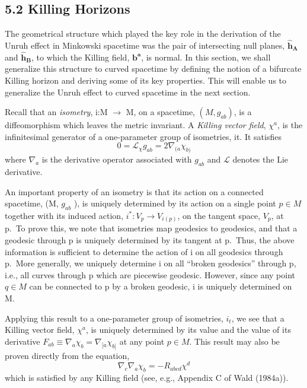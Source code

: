 \documentclass[11pt,a4paper]{article}
\begin{document}
\subsection*{5.2 Killing Horizons}\hypertarget{sec:5.2}{}

The geometrical structure which played the key role in the derivation of the Unruh effect in Minkowski spacetime was the pair of intersecting null planes, \(\mathbf{\hat{h}_A}\) and \(\mathbf{\hat{h}_B}\), to which the Killing field, \(\mathbf{b^a}\), is normal. In this section, we shall generalize this structure to curved spacetime by defining the notion of a bifurcate Killing horizon and deriving some of its key properties. This will enable us to generalize the Unruh effect to curved spacetime in the next section.

Recall that an \emph{isometry}, i:M \(\rightarrow\) M, on a spacetime, \((M,g_{ab})\), is a diffeomorphism which leaves the metric invariant. A \emph{Killing vector field}, \(\chi^a\), is the infinitesimal generator of a one-parameter group of isometries, it. It satisfies
\begin{equation*}
0 = \mathcal L_\chi g_{ab} = 2\nabla_{(a} \chi_{b)} \tag{5.2.1}\label{eq:5.2.1}
\end{equation*} \hypertarget{source-132}{} where \(\nabla_a\) is the derivative operator associated with \(g_{ab}\) and \(\mathcal{L}\) denotes the Lie derivative.

An important property of an isometry is that its action on a connected spacetime, (M, \(g_{ab}\) ), is uniquely determined by its action on a single point \(p\in M\) together with its induced action, \(i^*:V_p \rightarrow V_{i(p)}\), on the tangent space, \(V_p\), at p.~To prove this, we note that isometries map geodesics to geodesics, and that a geodesic through p is uniquely determined by its tangent at p.~Thus, the above information is sufficient to determine the action of i on all geodesics through p.~More generally, we uniquely determine i on all ``broken geodesics'' through p, i.e., all curves through p which are piecewise geodesic. However, since any point \(q\in M\) can be connected to p by a broken geodesic, i is uniquely determined on M.

Applying this result to a one-parameter group of isometries, \(i_t\), we see that a Killing vector field, \(\chi^a\), is uniquely determined by its value and the value of its derivative \(F_{ab} \equiv \nabla_a \chi_b = \nabla_{[a} \chi_{b]}\) at any point \(p \in M\). This result may also be proven directly from the equation,
\begin{equation*}
\nabla_c \nabla_a \chi_b = -R_{abcd} \chi^d \tag{5.2.2}\label{eq:5.2.2}
\end{equation*}
which is satisfied by any Killing field (see, e.g., Appendix C of Wald (1984a)).
\end{document}
